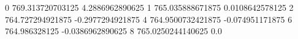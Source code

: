 0 769.313720703125 4.2886962890625
1 765.035888671875 0.0108642578125
2 764.727294921875 -0.2977294921875
4 764.9500732421875 -0.074951171875
6 764.986328125 -0.0386962890625
8 765.0250244140625 0.0
